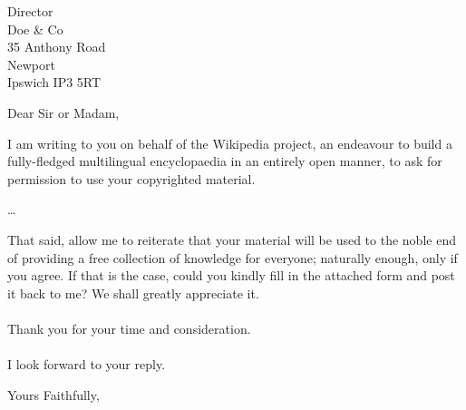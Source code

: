 \documentclass[a4paper]{scrlttr2}
\begin{document}
\begin{letter}{Director \\ Doe \& Co \\ 35 Anthony Road
\\ Newport \\ Ipswich IP3 5RT}

\opening{Dear Sir or Madam,}

I am writing to you on behalf of the Wikipedia project, an endeavour to build a
fully-fledged multilingual encyclopaedia in an entirely open
manner, to ask for permission to use your copyrighted material.

\ldots 
 
That said, allow me to reiterate that your material will be used
to the noble end of providing a free collection of knowledge for
everyone; naturally enough, only if you agree. If that is the
case, could you kindly fill in the attached form and post it back
to me? We shall greatly appreciate it. \\
\\
Thank you for your time and consideration. \\
\\
I look forward to your reply. \\

\closing{Yours Faithfully,}

\end{letter}
\end{document}
